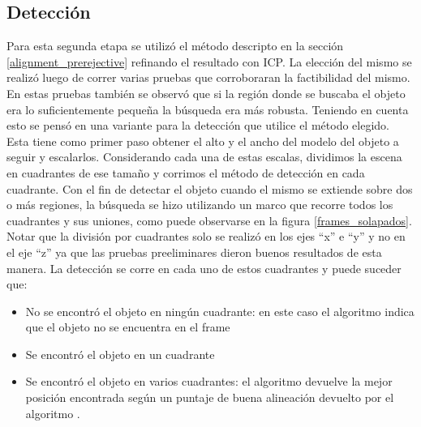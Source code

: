 \subsection{Detección}
Para esta segunda etapa se utilizó el método descripto en la sección \ref{alignment_prerejective} refinando el resultado con ICP. La elección del mismo se realizó luego de correr varias pruebas que corroboraran la factibilidad del mismo. En estas pruebas también se observó que si la región donde se buscaba el objeto era lo suficientemente pequeña la búsqueda era más robusta. Teniendo en cuenta esto se pensó en una variante para la detección que utilice el método elegido. Esta tiene como primer paso obtener el alto y el ancho del modelo del objeto a seguir y escalarlos. Considerando cada una de estas escalas, dividimos la escena en cuadrantes de ese tamaño y corrimos el método de detección en cada cuadrante. Con el fin de detectar el objeto cuando el mismo se extiende sobre dos o más regiones, la búsqueda se hizo utilizando un marco que recorre todos los cuadrantes y sus uniones, como puede observarse en la figura \ref{frames_solapados}. Notar que la división por cuadrantes solo se realizó en los ejes ``x'' e ``y'' y no en el eje ``z'' ya que las pruebas preeliminares dieron buenos resultados de esta manera. La detección se corre en cada uno de estos cuadrantes y puede suceder que:
\begin{itemize}
	\item No se encontró el objeto en ningún cuadrante: en este caso el algoritmo indica que el objeto no se encuentra en el frame
	\item Se encontró el objeto en un cuadrante
	\item Se encontró el objeto en varios cuadrantes: el algoritmo devuelve la mejor posición encontrada según un puntaje de buena alineación devuelto por el algoritmo \ap.
\end{itemize}

